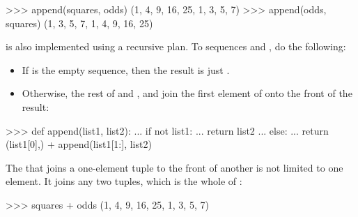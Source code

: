 \begin{codeBlock}
>>> append(squares, odds)
(1, 4, 9, 16, 25, 1, 3, 5, 7)
>>> append(odds, squares)
(1, 3, 5, 7, 1, 4, 9, 16, 25)
\end{codeBlock}

\noindent
{} is also implemented using a recursive plan.  To 
sequences  and , do the following:

\begin{itemize}
\item
If  is the empty sequence, then the result is just .

\item
Otherwise,  the rest of  and , and join
the first element of  onto the front of the result:
\end{itemize}

\begin{codeBlock}
>>> def append(list1, list2):
...     if not list1:
...         return list2
...     else:
...         return (list1[0],) + append(list1[1:], list2)
\end{codeBlock}

\noindent
\begin{revealTheSurface}
The \code{+} that joins a one-element tuple to the front of another is not
limited to one element.  It joins any two tuples, which is the whole of
:

\begin{codeBlock}
>>> squares + odds
(1, 4, 9, 16, 25, 1, 3, 5, 7)
\end{codeBlock}
\end{revealTheSurface}

